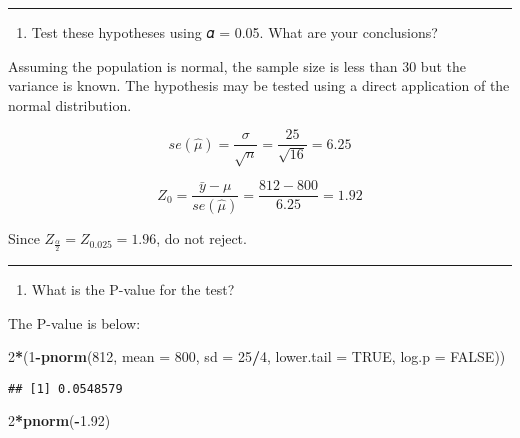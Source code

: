 \documentclass[]{article}
\newenvironment{Shaded}{\begin{snugshade}}{\end{snugshade}}
\newcommand{\DataTypeTok}[1]{\textcolor[rgb]{0.13,0.29,0.53}{#1}}
\newcommand{\DecValTok}[1]{\textcolor[rgb]{0.00,0.00,0.81}{#1}}
\newcommand{\FloatTok}[1]{\textcolor[rgb]{0.00,0.00,0.81}{#1}}
\newcommand{\KeywordTok}[1]{\textcolor[rgb]{0.13,0.29,0.53}{\textbf{#1}}}
\newcommand{\NormalTok}[1]{#1}
\newcommand{\OperatorTok}[1]{\textcolor[rgb]{0.81,0.36,0.00}{\textbf{#1}}}
\newcommand{\OtherTok}[1]{\textcolor[rgb]{0.56,0.35,0.01}{#1}}
\providecommand{\tightlist}{%
  \setlength{\itemsep}{0pt}\setlength{\parskip}{0pt}}
\begin{document}
\begin{center}\rule{0.5\linewidth}{\linethickness}\end{center}

\begin{enumerate}
\def\labelenumi{(\alph{enumi})}
\setcounter{enumi}{1}
\tightlist
\item
  Test these hypotheses using 𝛼 = 0.05. What are your conclusions?
\end{enumerate}

Assuming the population is normal, the sample size is less than 30 but
the variance is known. The hypothesis may be tested using a direct
application of the normal distribution.

\[se(\hat\mu)=\frac{σ}{\sqrt{n}}=\frac{25}{\sqrt{16}}=6.25\]

\[Z_0=\frac{\bar y-\mu}{se(\hat\mu)}=\frac{812-800}{6.25}=1.92 \]

Since \(Z_{\frac{α}2} =Z_{0.025}=1.96\), do not reject.

\begin{center}\rule{0.5\linewidth}{\linethickness}\end{center}

\begin{enumerate}
\def\labelenumi{(\alph{enumi})}
\setcounter{enumi}{2}
\tightlist
\item
  What is the P-value for the test?
\end{enumerate}

The P-value is below:

\begin{Shaded}
\begin{Highlighting}[]
\DecValTok{2}\OperatorTok{*}\NormalTok{(}\DecValTok{1}\OperatorTok{-}\KeywordTok{pnorm}\NormalTok{(}\DecValTok{812}\NormalTok{, }\DataTypeTok{mean =} \DecValTok{800}\NormalTok{, }\DataTypeTok{sd =} \DecValTok{25}\OperatorTok{/}\DecValTok{4}\NormalTok{, }\DataTypeTok{lower.tail =} \OtherTok{TRUE}\NormalTok{, }\DataTypeTok{log.p =} \OtherTok{FALSE}\NormalTok{))}
\end{Highlighting}
\end{Shaded}

\begin{verbatim}
## [1] 0.0548579
\end{verbatim}

\begin{Shaded}
\begin{Highlighting}[]
\DecValTok{2}\OperatorTok{*}\KeywordTok{pnorm}\NormalTok{(}\OperatorTok{-}\FloatTok{1.92}\NormalTok{)}
\end{Highlighting}
\end{Shaded}
\end{document}
